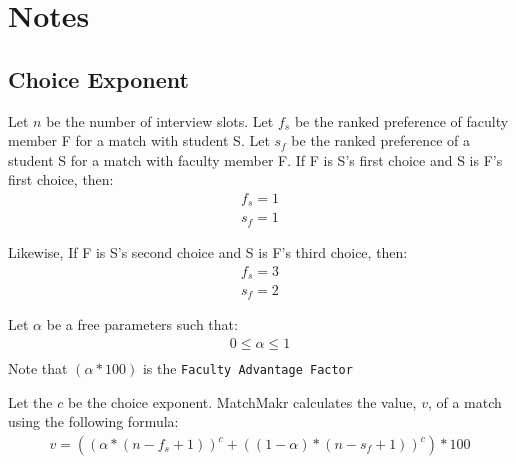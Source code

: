 %
%
\buttontable


%
%
\section{Notes}

\subsection{Choice Exponent}
Let $n$ be the number of interview slots.  Let $f_s$ be the ranked preference of faculty member F for a match with student S.  Let $s_f$ be the ranked preference of a student S for a match with faculty member F.  If F is S's first choice and S is F's first choice, then:
\begin{equation}
	\begin{aligned}
		f_s = 1 \\
		s_f = 1
	\end{aligned}
\end{equation}

Likewise, If F is S's second choice and S is F's third choice, then:
\begin{equation}
	\begin{aligned}
		f_s = 3 \\
		s_f = 2
	\end{aligned}
\end{equation}

Let $\alpha$ be a free parameters such that:
\begin{equation}
	\begin{aligned}
		0 \le \alpha \le 1 \\
	\end{aligned}
\end{equation}
Note that $(\alpha * 100)$ is the \texttt{Faculty Advantage Factor}

Let the $c$ be the choice exponent.  MatchMakr calculates the value, $v$, of a match using the following formula:
\begin{equation}
	\label{eq:value}
	\begin{aligned}
		v = \left( (\alpha * (n - f_s + 1))^c + ((1-\alpha) * (n - s_f + 1))^c  \right) * 100\\
	\end{aligned}
\end{equation}


